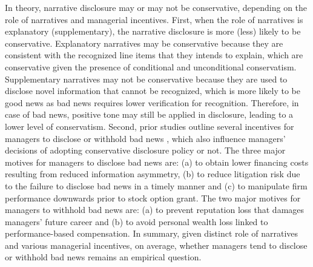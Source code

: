 \documentclass[a4paper]{article}
\begin{document}
\begin{spacing}{2}
In theory, narrative disclosure may or may not be conservative, depending on the role of narratives and managerial incentives. First, when the role of narratives is explanatory (supplementary), the narrative disclosure is more (less) likely to be conservative. Explanatory narratives may be conservative because they are consistent with the recognized line items that they intends to explain, which are conservative given the presence of conditional and unconditional conservatism. Supplementary narratives may not be conservative because they are used to disclose novel information that cannot be recognized, which is more likely to be good news as bad news requires lower verification for recognition. Therefore, in case of bad news, positive tone may still be applied in disclosure, leading to a lower level of conservatism. Second, prior studies outline several incentives for managers to disclose or withhold bad news \cite{skinnerWhyFirmsVoluntarily1994, skinnerEarningsDisclosuresStockholder1997, kothariManagersWithholdBad2009, baoManagersDiscloseWithhold2019}, which also influence managers' decisions of adopting conservative disclosure policy or not. The three major motives for managers to disclose bad news are: (a) to obtain lower financing costs resulting from reduced information asymmetry, (b) to reduce litigation risk due to the failure to disclose bad news in a timely manner and (c) to manipulate firm performance downwards prior to stock option grant. The two major motives for managers to withhold bad news are: (a) to prevent reputation loss that damages managers' future career and (b) to avoid personal wealth loss linked to performance-based compensation. In summary, given distinct role of narratives and various managerial incentives, on average, whether managers tend to disclose or withhold bad news remains an empirical question.


\end{spacing}
\end{document}
